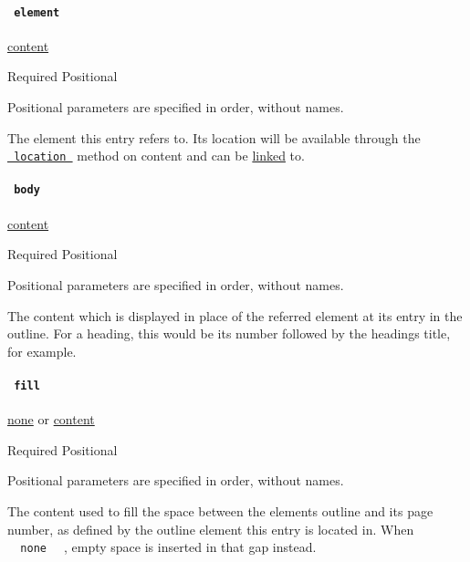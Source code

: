 \paragraph{\texorpdfstring{\texttt{\ element\ }}{ element }}\label{definitions-entry-element}

\href{/docs/reference/foundations/content/}{content}

{Required} {{ Positional }}

\label{definitions-entry-element-positional-tooltip}
Positional parameters are specified in order, without names.

The element this entry refers to. Its location will be available through
the
\href{/docs/reference/foundations/content/\#definitions-location}{\texttt{\ location\ }}
method on content and can be \href{/docs/reference/model/link/}{linked}
to.

\paragraph{\texorpdfstring{\texttt{\ body\ }}{ body }}\label{definitions-entry-body}

\href{/docs/reference/foundations/content/}{content}

{Required} {{ Positional }}

\label{definitions-entry-body-positional-tooltip}
Positional parameters are specified in order, without names.

The content which is displayed in place of the referred element at its
entry in the outline. For a heading, this would be its number followed
by the heading\textquotesingle s title, for example.

\paragraph{\texorpdfstring{\texttt{\ fill\ }}{ fill }}\label{definitions-entry-fill}

\href{/docs/reference/foundations/none/}{none} {or}
\href{/docs/reference/foundations/content/}{content}

{Required} {{ Positional }}

\label{definitions-entry-fill-positional-tooltip}
Positional parameters are specified in order, without names.

The content used to fill the space between the element\textquotesingle s
outline and its page number, as defined by the outline element this
entry is located in. When \texttt{\ }{\texttt{\ none\ }}\texttt{\ } ,
empty space is inserted in that gap instead.

